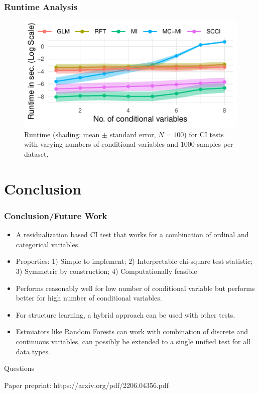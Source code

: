\documentclass{beamer}
\begin{document}
\begin{frame}
	\frametitle{Runtime Analysis}
	\begin{figure}
		\centering
		\includegraphics{imgs/runtime.pdf}
		\caption*{Runtime (shading: mean $\pm$ standard error, $N=100$)
		for CI tests with varying numbers of conditional variables and
		$1000$ samples per dataset.
		}
	\end{figure}
\end{frame}

\section{Conclusion}
\begin{frame}
	\frametitle{Conclusion/Future Work}
	\begin{itemize}
		\setlength\itemsep{1em}
		\item A residualization based CI test that works for a combination of ordinal and categorical variables.
		\item Properties: 1) Simple to implement; 2) Interpretable chi-square test statistic; 3) Symmetric by construction; 4) Computationally feasible
		\item Performs reasonably well for low number of
			conditional variable but performs better for high
			number of conditional variables.
		\item For structure learning, a hybrid approach can be used with other
			tests.
		\item Estmiators like Random Forests can work with combination of discrete and 
			continuous variables, can possibly be extended to a single 
			unified test for all data types.
	\end{itemize}
\end{frame}

\begin{frame}
	\begin{center}
		\Huge{Questions}
	\end{center}
	\begin{center}
		Paper preprint: https://arxiv.org/pdf/2206.04356.pdf
	\end{center}
\end{frame}
\end{document}

